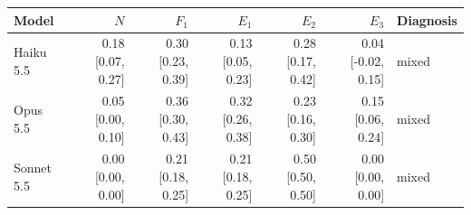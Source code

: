 \begin{tabular}{@{}lrrrrrl@{}}
\toprule
Model & $N$ & $F_1$ & $E_1$ & $E_2$ & $E_3$ & Diagnosis \\
\midrule
Haiku 5.5 & 0.18 {\scriptsize[0.07, 0.27]} & 0.30 {\scriptsize[0.23, 0.39]} & 0.13 {\scriptsize[0.05, 0.23]} & 0.28 {\scriptsize[0.17, 0.42]} & 0.04 {\scriptsize[-0.02, 0.15]} & mixed \\
Opus 5.5 & 0.05 {\scriptsize[0.00, 0.10]} & 0.36 {\scriptsize[0.30, 0.43]} & 0.32 {\scriptsize[0.26, 0.38]} & 0.23 {\scriptsize[0.16, 0.30]} & 0.15 {\scriptsize[0.06, 0.24]} & mixed \\
Sonnet 5.5 & 0.00 {\scriptsize[0.00, 0.00]} & 0.21 {\scriptsize[0.18, 0.25]} & 0.21 {\scriptsize[0.18, 0.25]} & 0.50 {\scriptsize[0.50, 0.50]} & 0.00 {\scriptsize[0.00, 0.00]} & mixed \\
\bottomrule
\end{tabular}
